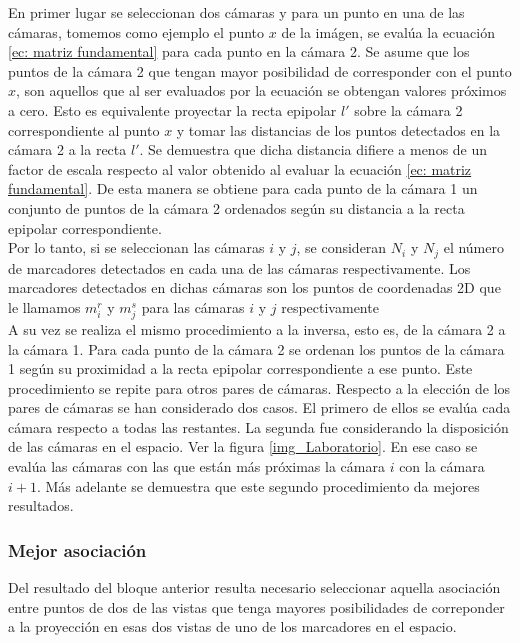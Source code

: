 En primer lugar se seleccionan dos cámaras y para un punto en una de las cámaras, tomemos como ejemplo el punto $x$ de la imágen, se evalúa la ecuación \ref{ec: matriz fundamental} para cada punto en la cámara 2. Se asume que los puntos de la cámara 2 que tengan mayor posibilidad de corresponder con el punto $x$, son aquellos que al ser evaluados por la ecuación se obtengan valores próximos a cero. Esto es equivalente proyectar la recta epipolar $l'$ sobre la cámara 2 correspondiente al punto $x$ y tomar las distancias de los puntos detectados en la cámara 2 a la recta $l'$. Se demuestra que dicha distancia difiere a menos de un factor de escala respecto al valor obtenido al evaluar la ecuación \ref{ec: matriz fundamental}. De esta manera se obtiene para cada punto de la cámara 1 un conjunto de puntos de la cámara 2 ordenados según su distancia a la recta epipolar correspondiente.\\

Por lo tanto, si se seleccionan las cámaras $i$ y $j$, se consideran $N_{i}$ y $N_{j}$ el número de marcadores detectados en cada una de las cámaras respectivamente. Los marcadores detectados en dichas cámaras son los puntos de coordenadas 2D que le llamamos $m_i^r$ y $m_j^s$ para las cámaras $i$ y $j$ respectivamente\\

A su vez se realiza el mismo procedimiento a la inversa, esto es, de la cámara 2 a la cámara 1. Para cada punto de la cámara 2 se ordenan los puntos de la cámara 1 según su proximidad a la recta epipolar correspondiente a ese punto. Este procedimiento se repite para otros pares de cámaras. Respecto a la elección de los pares de cámaras se han considerado dos casos. El primero de ellos se evalúa cada cámara respecto a todas las restantes. La segunda fue considerando la disposición de las cámaras en el espacio. Ver la figura \ref{img_Laboratorio}. En ese caso se evalúa las cámaras con las que están más próximas la cámara $i$ con la cámara $i+1$. Más adelante se demuestra que este segundo procedimiento da mejores resultados. \\

\subsubsection*{Mejor asociación}

Del resultado del bloque anterior resulta necesario seleccionar aquella asociación entre puntos de dos de las vistas que tenga mayores posibilidades de correponder a la proyección en esas dos vistas de uno de los marcadores en el espacio.\\

